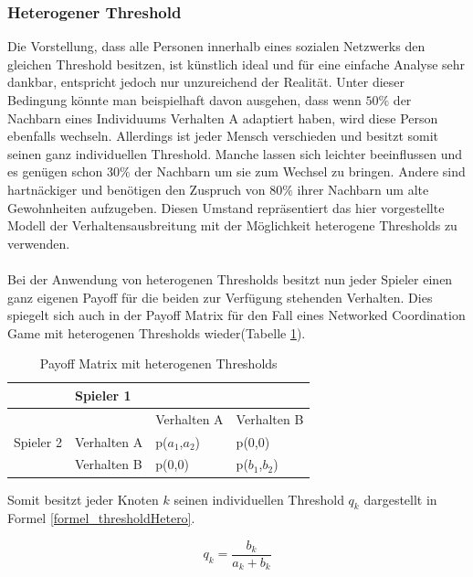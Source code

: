 \documentclass[12pt]{article}
\begin{document}
\subsubsection{Heterogener Threshold}
\label{sss_heteroThresh}
Die Vorstellung, dass alle Personen innerhalb eines sozialen Netzwerks den gleichen Threshold besitzen, ist künstlich ideal und für eine einfache Analyse sehr dankbar, entspricht jedoch nur unzureichend der Realität. Unter dieser Bedingung könnte man beispielhaft davon ausgehen, dass wenn $50\%$ der Nachbarn eines Individuums Verhalten A adaptiert haben, wird diese Person ebenfalls wechseln. Allerdings ist jeder Mensch verschieden und besitzt somit seinen ganz individuellen Threshold. Manche lassen sich leichter beeinflussen und es genügen schon $30\%$ der Nachbarn um sie zum Wechsel zu bringen. Andere sind hartnäckiger und benötigen den Zuspruch von $80\%$ ihrer Nachbarn um alte Gewohnheiten aufzugeben. Diesen Umstand repräsentiert das hier vorgestellte Modell der Verhaltensausbreitung mit der Möglichkeit heterogene Thresholds zu verwenden.\\\\
Bei der Anwendung von heterogenen Thresholds besitzt nun jeder Spieler einen ganz eigenen Payoff für die beiden zur Verfügung stehenden Verhalten. Dies spiegelt sich auch in der Payoff Matrix für den Fall eines Networked Coordination Game mit heterogenen Thresholds wieder(Tabelle \ref{table_payofHetero}).
\begin{table}[h]
\centering
\caption{Payoff Matrix mit heterogenen Thresholds}
\label{table_payofHetero}
\begin{tabular}{|l|l|l|l|}
\hline
                           & \multicolumn{3}{l|}{Spieler 1}           \\ \hline
\multirow{3}{*}{Spieler 2} &             & Verhalten A  & Verhalten B \\ \cline{2-4} 
                           & Verhalten A & p($a_1$,$a_2$) & p(0,0)      \\ \cline{2-4} 
                           & Verhalten B & p(0,0)       & p($b_1$,$b_2$)      \\ \hline
\end{tabular}
\end{table}
Somit besitzt jeder Knoten $k$ seinen individuellen Threshold $q_k$ dargestellt in Formel \ref{formel_thresholdHetero}.

%
  \begin{equation}
 \label{formel_thresholdHetero}
 q_k =  \frac{b_k}{a_k+b_k}
 \end{equation}
 
\end{document}
